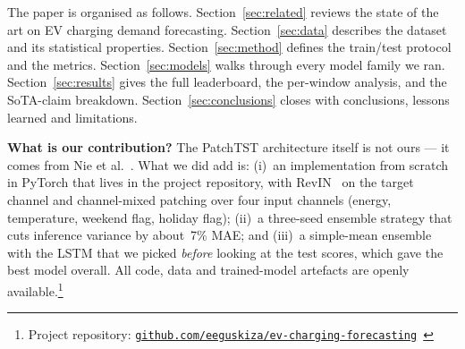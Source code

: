 The paper is organised as follows.
Section~\ref{sec:related} reviews the state of the art on EV
charging demand forecasting.
Section~\ref{sec:data} describes the dataset and its statistical
properties.
Section~\ref{sec:method} defines the train/test protocol and the
metrics.
Section~\ref{sec:models} walks through every model family we ran.
Section~\ref{sec:results} gives the full leaderboard, the per-window
analysis, and the SoTA-claim breakdown.
Section~\ref{sec:conclusions} closes with conclusions, lessons learned
and limitations.

\medskip
\noindent
\textbf{What is our contribution?} The PatchTST architecture itself is
not ours --- it comes from Nie et al.~\cite{nie2023patchtst}. What we
did add is: (i)~an implementation from scratch in PyTorch that lives
in the project repository, with RevIN~\cite{kim2022revin} on the
target channel and channel-mixed patching over four input channels
(energy, temperature, weekend flag, holiday flag); (ii)~a three-seed
ensemble strategy that cuts inference variance by about~7\% MAE; and
(iii)~a simple-mean ensemble with the LSTM that we picked
\emph{before} looking at the test scores, which gave the best model
overall. All code, data and trained-model artefacts are openly
available.\footnote{Project repository:
\href{https://github.com/eeguskiza/ev-charging-forecasting}{\texttt{github.com/eeguskiza/ev-charging-forecasting}}~\cite{ourrepo}}
